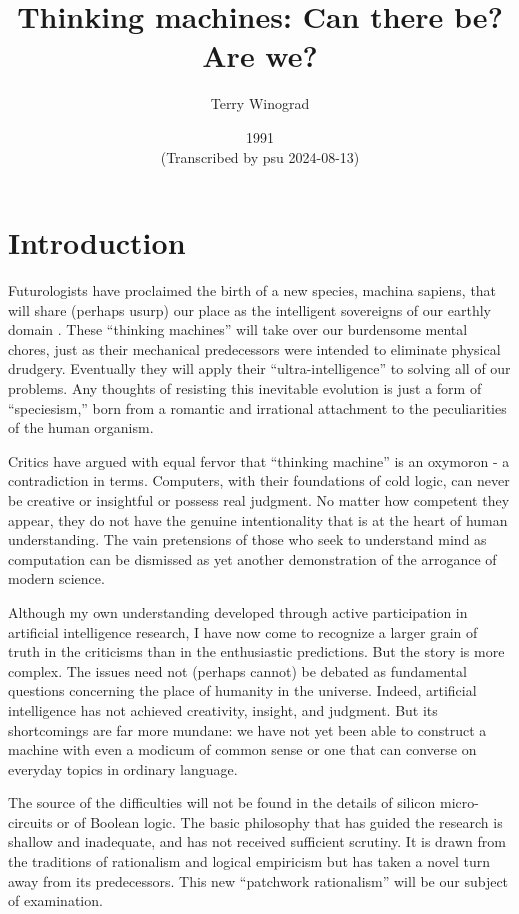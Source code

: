 \documentclass[12pt]{article}
\begin{document}
\title{\Large Thinking machines: Can there be? Are we?}
\author{\large Terry Winograd}
\date{\normalsize 1991 \\ {\footnotesize (Transcribed by psu 2024-08-13)}}

\maketitle

\section{Introduction}

Futurologists have proclaimed the birth of a new species, machina sapiens, that will share (perhaps usurp) our place as the intelligent sovereigns of our earthly domain . These ``thinking machines'' will take over our burdensome mental chores, just as their mechanical predecessors were intended to eliminate physical drudgery. Eventually they will apply their “ultra-intelligence” to solving all of our problems. Any thoughts of resisting this inevitable evolution is just a form of “speciesism,” born from a romantic and irrational attachment to the peculiarities of the human organism.

Critics have argued with equal fervor that “thinking machine” is an oxymoron - a contradiction in terms. Computers, with their foundations of cold logic, can never be creative or insightful or possess real judgment. No matter how competent they appear, they do not have the genuine intentionality that is at the heart of human understanding. The vain pretensions of those who seek to understand mind as computation can be dismissed as yet another demonstration of the arrogance of modern science.

Although my own understanding developed through active participation in artificial intelligence research, I have now come to recognize a larger grain of truth in the criticisms than in the enthusiastic predictions. But the story is more complex. The issues need not (perhaps cannot) be debated as fundamental questions concerning the place of humanity in the universe. Indeed, artificial intelligence has not achieved creativity, insight, and judgment. But its shortcomings are far more mundane: we have not yet been able to construct a machine with even a modicum of common sense or one that can converse on everyday topics in ordinary language.

The source of the difficulties will not be found in the details of silicon micro-circuits or of Boolean logic. The basic philosophy that has guided the research is shallow and inadequate, and has not received sufficient scrutiny. It is drawn from the traditions of rationalism and logical empiricism but has taken a novel turn away from its predecessors. This new ``patchwork rationalism'' will be our subject of examination.
\end{document}

